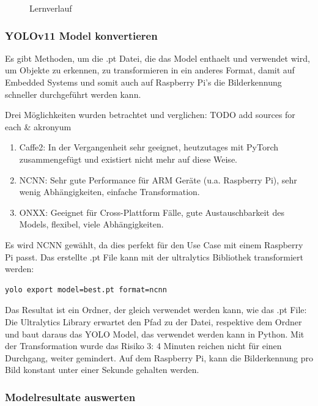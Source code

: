 \begin{figure}[H]
\begin{minipage}[b]{0.3\textwidth}
    \caption{Lernverlauf}
    \label{fig:results-lernverlauf}
  \end{minipage}
\end{figure}

\subsubsection{YOLOv11 Model konvertieren}
\label{convert-yolo}

Es gibt Methoden, um die .pt Datei, die das Model enthaelt und verwendet wird, um Objekte zu erkennen, zu transformieren in ein anderes Format, damit auf Embedded Systems und somit auch auf Raspberry Pi's die Bilderkennung schneller durchgeführt werden kann.

Drei Möglichkeiten wurden betrachtet und verglichen:
TODO add sources for each \& akronyum
\begin{enumerate}
    \item Caffe2: In der Vergangenheit sehr geeignet, heutzutages mit PyTorch zusammengefügt und existiert nicht mehr auf diese Weise.
    \item NCNN: Sehr gute Performance für ARM Geräte (u.a. Raspberry Pi), sehr wenig Abhängigkeiten, einfache Transformation.
    \item ONXX: Geeignet für  Cross-Plattform Fälle, gute Austauschbarkeit des Models, flexibel, viele Abhängigkeiten.
\end{enumerate}

Es wird NCNN gewählt, da dies perfekt für den Use Case mit einem Raspberry Pi passt. Das erstellte .pt File kann mit der ultralytics Bibliothek transformiert werden:

\begin{verbatim}
yolo export model=best.pt format=ncnn
\end{verbatim}

Das Resultat ist ein Ordner, der gleich verwendet werden kann, wie das .pt File: Die Ultralytics Library erwartet den Pfad zu der Datei, respektive dem Ordner und baut daraus das YOLO Model, das verwendet werden kann in Python. Mit der Transformation wurde das Risiko 3: 4 Minuten reichen nicht für einen Durchgang, weiter gemindert. Auf dem Raspberry Pi, kann die Bilderkennung pro Bild konstant unter einer Sekunde gehalten werden.

\subsubsection{Modelresultate auswerten}
\label{model-results}

